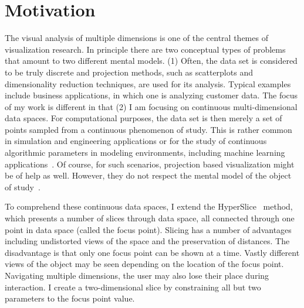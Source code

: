 \section{Motivation}
\label{sec:motivation}


The visual analysis of multiple dimensions is one of the central themes of
visualization research. In principle there are two conceptual types of problems
that amount to two different mental models. (1) Often, the data set is considered to be truly discrete 
and projection methods, such as 
scatterplots and dimensionality reduction techniques, are used for its analysis.
Typical examples include business applications, in which one is analyzing
customer data.
The focus of
my work is different in that (2) I am focusing on continuous multi-dimensional data spaces. For computational purposes, the data set is then merely a
set of points sampled from a continuous phenomenon of study. This is
rather common in simulation and engineering applications or for the study of
continuous algorithmic parameters in modeling environments, including machine
learning applications~\cite{Sedlmair:2014}. Of course, for such scenarios, projection based
visualization might be of help as well. However, they do not respect the mental
model of the object of study~\cite{Tory:2004}.

To comprehend these continuous data spaces, I extend the
HyperSlice~\cite{Wijk:1993} method, which presents a number of slices through
data space, all connected through one point in data space (called the focus
point). Slicing has a number of advantages including undistorted views of the
space and the preservation of distances. The disadvantage is that only one
focus point can be shown at a time. Vastly different views of the object may be
seen depending on the location of the focus point. Navigating multiple
dimensions, the user may also lose their place during interaction.  I create a
two-dimensional slice by constraining all but two parameters to the focus point
value.

